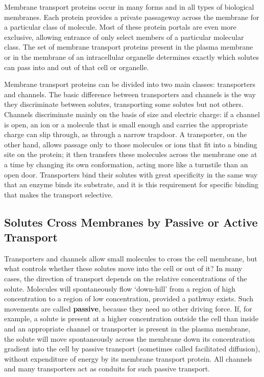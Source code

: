 Membrane transport proteins occur in many forms and in all types of biological
membranes. Each protein provides a private passageway across
the membrane for a particular class of molecule. Most of these protein portals are even more exclusive,
allowing entrance of only select members of a particular molecular class.
The set of membrane transport proteins present in the plasma
membrane or in the membrane of an intracellular organelle determines
exactly which solutes can pass into and out of that cell or organelle.

Membrane transport proteins can be divided into two main classes:
transporters and channels. The basic difference between transporters
and channels is the way they discriminate between solutes, transporting
some solutes but not others. Channels discriminate mainly
on the basis of size and electric charge: if a channel is open, an ion or a
molecule that is small enough and carries the appropriate charge can slip
through, as through a narrow trapdoor. A transporter, on the other hand,
allows passage only to those molecules or ions that fit into a binding
site on the protein; it then transfers these molecules across the membrane
one at a time by changing its own conformation, acting more like
a turnstile than an open door. Transporters bind their solutes with great
specificity in the same way that an enzyme binds its substrate, and it is
this requirement for specific binding that makes the transport selective.

\subsection{Solutes Cross Membranes by Passive or Active Transport}

Transporters and channels allow small molecules to cross the cell membrane,
but what controls whether these solutes move into the cell or out
of it? In many cases, the direction of transport depends on the relative
concentrations of the solute. Molecules will spontaneously flow ‘down-hill’
from a region of high concentration to a region of low concentration,
provided a pathway exists. Such movements are called \textbf{passive}, because
they need no other driving force. If, for example, a solute is present at
a higher concentration outside the cell than inside and an appropriate
channel or transporter is present in the plasma membrane, the solute
will move spontaneously across the membrane down its concentration
gradient into the cell by passive transport (sometimes called facilitated
diffusion), without expenditure of energy by its membrane transport protein.
All channels and many transporters act as conduits for such passive
transport.


